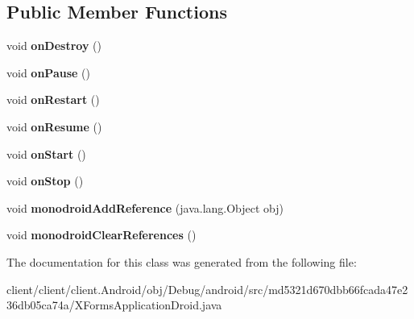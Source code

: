 \subsection*{Public Member Functions}
\begin{DoxyCompactItemize}
\item 
\hypertarget{classmd5321d670dbb66fcada47e236db05ca74a_1_1XFormsApplicationDroid_a7fd47951b4780df033cb82cebbafa69d}{}void {\bfseries on\+Destroy} ()\label{classmd5321d670dbb66fcada47e236db05ca74a_1_1XFormsApplicationDroid_a7fd47951b4780df033cb82cebbafa69d}

\item 
\hypertarget{classmd5321d670dbb66fcada47e236db05ca74a_1_1XFormsApplicationDroid_a681ce6aefef2c14aaf33fd55c046b8fe}{}void {\bfseries on\+Pause} ()\label{classmd5321d670dbb66fcada47e236db05ca74a_1_1XFormsApplicationDroid_a681ce6aefef2c14aaf33fd55c046b8fe}

\item 
\hypertarget{classmd5321d670dbb66fcada47e236db05ca74a_1_1XFormsApplicationDroid_ae100b908bfd9282c38bc958d1f421c3f}{}void {\bfseries on\+Restart} ()\label{classmd5321d670dbb66fcada47e236db05ca74a_1_1XFormsApplicationDroid_ae100b908bfd9282c38bc958d1f421c3f}

\item 
\hypertarget{classmd5321d670dbb66fcada47e236db05ca74a_1_1XFormsApplicationDroid_ac18223d81952fc7443a9dfe75253efc1}{}void {\bfseries on\+Resume} ()\label{classmd5321d670dbb66fcada47e236db05ca74a_1_1XFormsApplicationDroid_ac18223d81952fc7443a9dfe75253efc1}

\item 
\hypertarget{classmd5321d670dbb66fcada47e236db05ca74a_1_1XFormsApplicationDroid_adb33c935909e427de6d9ca21523d5037}{}void {\bfseries on\+Start} ()\label{classmd5321d670dbb66fcada47e236db05ca74a_1_1XFormsApplicationDroid_adb33c935909e427de6d9ca21523d5037}

\item 
\hypertarget{classmd5321d670dbb66fcada47e236db05ca74a_1_1XFormsApplicationDroid_ab865f03161a6bed44fdfe824b63fb577}{}void {\bfseries on\+Stop} ()\label{classmd5321d670dbb66fcada47e236db05ca74a_1_1XFormsApplicationDroid_ab865f03161a6bed44fdfe824b63fb577}

\item 
\hypertarget{classmd5321d670dbb66fcada47e236db05ca74a_1_1XFormsApplicationDroid_ad64362f7ae28d559dc489967a5b142ee}{}void {\bfseries monodroid\+Add\+Reference} (java.\+lang.\+Object obj)\label{classmd5321d670dbb66fcada47e236db05ca74a_1_1XFormsApplicationDroid_ad64362f7ae28d559dc489967a5b142ee}

\item 
\hypertarget{classmd5321d670dbb66fcada47e236db05ca74a_1_1XFormsApplicationDroid_a56d71dd4e1774c020fdecf652ce5b32c}{}void {\bfseries monodroid\+Clear\+References} ()\label{classmd5321d670dbb66fcada47e236db05ca74a_1_1XFormsApplicationDroid_a56d71dd4e1774c020fdecf652ce5b32c}

\end{DoxyCompactItemize}


The documentation for this class was generated from the following file\+:\begin{DoxyCompactItemize}
\item 
client/client/client.\+Android/obj/\+Debug/android/src/md5321d670dbb66fcada47e236db05ca74a/X\+Forms\+Application\+Droid.\+java\end{DoxyCompactItemize}
